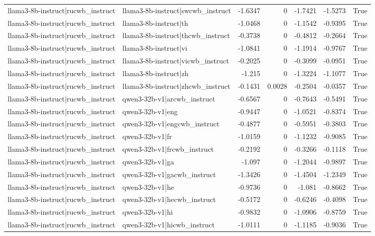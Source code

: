 \begin{table}
\begin{tabular}{l l r r r r l}
llama3-8b-instruct|rucwb_instruct & llama3-8b-instruct|swcwb_instruct & -1.6347 & 0 & -1.7421 & -1.5273 & True \\
llama3-8b-instruct|rucwb_instruct & llama3-8b-instruct|th & -1.0468 & 0 & -1.1542 & -0.9395 & True \\
llama3-8b-instruct|rucwb_instruct & llama3-8b-instruct|thcwb_instruct & -0.3738 & 0 & -0.4812 & -0.2664 & True \\
llama3-8b-instruct|rucwb_instruct & llama3-8b-instruct|vi & -1.0841 & 0 & -1.1914 & -0.9767 & True \\
llama3-8b-instruct|rucwb_instruct & llama3-8b-instruct|vicwb_instruct & -0.2025 & 0 & -0.3099 & -0.0951 & True \\
llama3-8b-instruct|rucwb_instruct & llama3-8b-instruct|zh & -1.215 & 0 & -1.3224 & -1.1077 & True \\
llama3-8b-instruct|rucwb_instruct & llama3-8b-instruct|zhcwb_instruct & -0.1431 & 0.0028 & -0.2504 & -0.0357 & True \\
llama3-8b-instruct|rucwb_instruct & qwen3-32b-v1|arcwb_instruct & -0.6567 & 0 & -0.7643 & -0.5491 & True \\
llama3-8b-instruct|rucwb_instruct & qwen3-32b-v1|eng & -0.9447 & 0 & -1.0521 & -0.8374 & True \\
llama3-8b-instruct|rucwb_instruct & qwen3-32b-v1|engcwb_instruct & -0.4877 & 0 & -0.5951 & -0.3803 & True \\
llama3-8b-instruct|rucwb_instruct & qwen3-32b-v1|fr & -1.0159 & 0 & -1.1232 & -0.9085 & True \\
llama3-8b-instruct|rucwb_instruct & qwen3-32b-v1|frcwb_instruct & -0.2192 & 0 & -0.3266 & -0.1118 & True \\
llama3-8b-instruct|rucwb_instruct & qwen3-32b-v1|ga & -1.097 & 0 & -1.2044 & -0.9897 & True \\
llama3-8b-instruct|rucwb_instruct & qwen3-32b-v1|gacwb_instruct & -1.3426 & 0 & -1.4504 & -1.2349 & True \\
llama3-8b-instruct|rucwb_instruct & qwen3-32b-v1|he & -0.9736 & 0 & -1.081 & -0.8662 & True \\
llama3-8b-instruct|rucwb_instruct & qwen3-32b-v1|hecwb_instruct & -0.5172 & 0 & -0.6246 & -0.4098 & True \\
llama3-8b-instruct|rucwb_instruct & qwen3-32b-v1|hi & -0.9832 & 0 & -1.0906 & -0.8759 & True \\
llama3-8b-instruct|rucwb_instruct & qwen3-32b-v1|hicwb_instruct & -1.0111 & 0 & -1.1185 & -0.9036 & True \\

\end{tabular}
\end{table}
